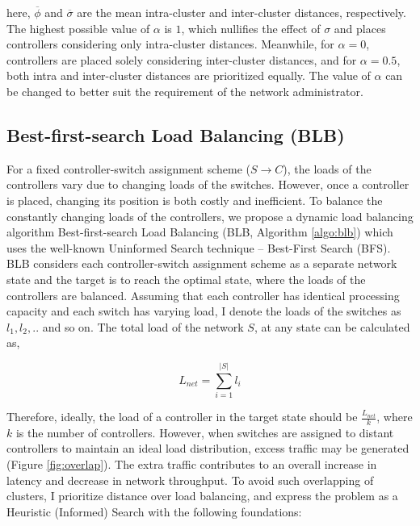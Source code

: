 \documentclass[preprint,12pt]{elsarticle}
\begin{document}
	here, $\overline{\phi}$ and $\overline{\sigma}$ are the  mean intra-cluster and inter-cluster distances, respectively. The highest possible value of $\alpha$ is $1$, which nullifies the effect of $\sigma$ and places controllers considering only intra-cluster distances. Meanwhile, for $\alpha = 0$, controllers are placed solely considering inter-cluster distances, and for $\alpha=0.5$, both intra and inter-cluster distances are prioritized equally. The value of $\alpha$ can be changed to better suit the requirement of the network administrator.
	
	\subsection{Best-first-search Load Balancing (BLB)} \label{blb}
	
	For a fixed controller-switch assignment scheme ($S\rightarrow C$), the loads of the controllers vary due to changing loads of the switches. However, once a controller is placed, changing its position is both costly and inefficient. To balance the constantly changing loads of the controllers, we propose a dynamic load balancing algorithm Best-first-search Load Balancing (BLB, Algorithm \ref{algo:blb}) which uses the well-known Uninformed Search technique -- Best-First Search (BFS). BLB considers each controller-switch assignment scheme as a separate network state and the target is to reach the optimal state, where the loads of the controllers are balanced. Assuming that each controller has identical processing capacity and each switch has varying load, I denote the loads of the switches as $l_1, l_2, . .$ and so on. The total load of the network $S$, at any state can be calculated as,
	
	\begin{equation}
	L_{net}=\sum_{i=1}^{|S|}l_i
	\end{equation}
	
	Therefore, ideally, the load of a controller in the target state should be $\frac{L_{net}}{k}$, where $k$ is the number of controllers. However, when switches are assigned to distant controllers to maintain an ideal load distribution, excess traffic may be generated (Figure \ref{fig:overlap}). The extra traffic contributes to an overall increase in latency and decrease in network throughput. To avoid such overlapping of clusters, I prioritize distance over load balancing, and express the problem as a Heuristic (Informed) Search with the following foundations:
	
\end{document}
